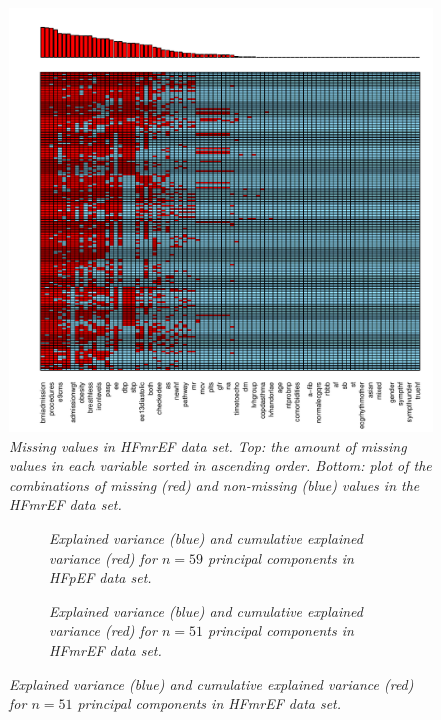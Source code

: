 \documentclass[../thesis.tex]{subfiles}
\begin{document}
\begin{figure}[h!]
    \centering
    \hspace*{-1cm}\includegraphics[width=1.1\textwidth]{doc/thesis/images/HFmrEF_miss_dist.pdf}
    \caption[Missing values in HFmrEF data set]{\textit{Missing values in HFmrEF data set. Top:  the amount of missing values in each variable sorted in ascending order. Bottom: plot of the combinations of missing (red) and non-missing (blue) values in the HFmrEF data set.}}
    \label{fig:HFmrEF_missing}
\end{figure}

\newpage

\begin{figure}[!ht]
\begin{subfigure}{\textwidth}
\centering
\resizebox{0.8\textwidth}{!}{\Large}
\caption{\textit{Explained variance (blue) and cumulative explained variance (red) for $n = 59$ principal components in HFpEF data set.}}
\end{subfigure}
\begin{subfigure}{\textwidth}
\centering
\resizebox{0.8\textwidth}{!}{\Large}
\caption{\textit{Explained variance (blue) and cumulative explained variance (red) for $n = 51$ principal components in HFmrEF data set.}}
\end{subfigure}
\end{figure}
\end{document}
